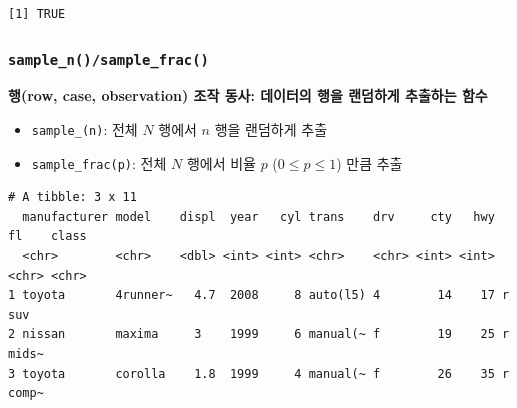 \documentclass[
  11pt,
]{krantz}
\makeatletter
\newenvironment{Shaded}{\begin{snugshade}}{\end{snugshade}}
\newcommand{\CommentTok}[1]{\textcolor[rgb]{0.37,0.37,0.37}{\textit{#1}}}
\newcommand{\DecValTok}[1]{\textcolor[rgb]{0.06,0.06,0.06}{#1}}
\newcommand{\KeywordTok}[1]{\textcolor[rgb]{0.27,0.27,0.27}{\textbf{#1}}}
\newcommand{\NormalTok}[1]{#1}
\newcommand{\OperatorTok}[1]{\textcolor[rgb]{0.43,0.43,0.43}{\textbf{#1}}}
\newcommand{\StringTok}[1]{\textcolor[rgb]{0.5,0.5,0.5}{#1}}
\providecommand{\tightlist}{%
  \setlength{\itemsep}{0pt}\setlength{\parskip}{0pt}}
\newenvironment{kframe}{%
\medskip{}
\setlength{\fboxsep}{.8em}
 \def\at@end@of@kframe{}%
 \ifinner\ifhmode%
  \def\at@end@of@kframe{\end{minipage}}%
  \begin{minipage}{\columnwidth}%
 \fi\fi%
 \def\FrameCommand##1{\hskip\@totalleftmargin \hskip-\fboxsep
 \colorbox{shadecolor}{##1}\hskip-\fboxsep
     \hskip-\linewidth \hskip-\@totalleftmargin \hskip\columnwidth}%
 \MakeFramed {\advance\hsize-\width
   \@totalleftmargin\z@ \linewidth\hsize
   \@setminipage}}%
 {\par\unskip\endMakeFramed%
 \at@end@of@kframe}
\renewenvironment{quote}{\begin{kframe}}{\end{kframe}}
\makeatother
\begin{document}
\begin{Shaded}
\end{Shaded}

\begin{verbatim}
[1] TRUE
\end{verbatim}

\normalsize

\hypertarget{dplyr-sample}{%
\subsubsection*{\texorpdfstring{\texttt{sample\_n()/sample\_frac()}}{sample\_n()/sample\_frac()}}\label{dplyr-sample}}


\begin{quote}
\textbf{행(row, case, observation) 조작 동사: 데이터의 행을 랜덤하게 추출하는 함수}
\end{quote}

\begin{itemize}
\tightlist
\item
  \texttt{sample\_(n)}: 전체 \(N\) 행에서 \(n\) 행을 랜덤하게 추출
\item
  \texttt{sample\_frac(p)}: 전체 \(N\) 행에서 비율 \(p\) (\(0\leq p \leq1\)) 만큼 추출
\end{itemize}

\footnotesize

\begin{Shaded}
\end{Shaded}

\begin{verbatim}
# A tibble: 3 x 11
  manufacturer model    displ  year   cyl trans    drv     cty   hwy fl    class
  <chr>        <chr>    <dbl> <int> <int> <chr>    <chr> <int> <int> <chr> <chr>
1 toyota       4runner~   4.7  2008     8 auto(l5) 4        14    17 r     suv  
2 nissan       maxima     3    1999     6 manual(~ f        19    25 r     mids~
3 toyota       corolla    1.8  1999     4 manual(~ f        26    35 r     comp~
\end{verbatim}
\end{document}

